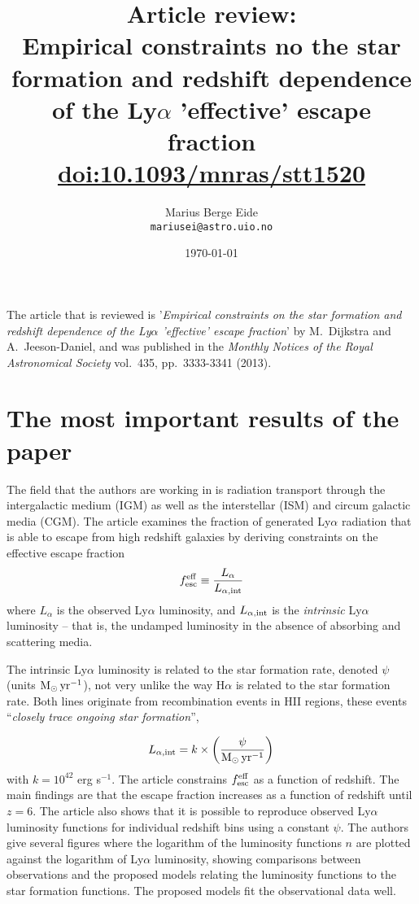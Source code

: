\documentclass[a4paper,11pt]{article}
\date{\today}
\title{\normalsize{Article review:\\ \textbf{Empirical constraints no the star formation and redshift dependence of the Ly$\alpha$ 'effective' escape fraction} \\
\href{http://dx.doi.org/10.1093/mnras/stt1520}{doi:10.1093/mnras/stt1520}} }
\author{Marius Berge Eide \\ \texttt{mariusei@astro.uio.no}}
\begin{document}
\onecolumn
\maketitle{}

The article that is reviewed is '\textit{Empirical constraints on the star formation and redshift dependence of the Ly$\alpha$ 'effective' escape fraction}' by M.~Dijkstra and A.~Jeeson-Daniel, and was published in the \textit{Monthly Notices of the Royal Astronomical Society} vol.~435, pp.~3333-3341 (2013).

\section{The most important results of the paper}
The field that the authors are working in is radiation transport through the intergalactic medium (IGM) as well as the interstellar (ISM) and circum galactic media (CGM). The article examines the fraction of generated Ly$\alpha$ radiation that is able to escape from high redshift galaxies by deriving constraints on the effective escape fraction
\begin{equation}
    f_{\rm esc}^{\rm eff} \equiv \frac{L_\alpha}{L_{\alpha,\rm int}}
    \label{eq:escfrac}
\end{equation}
where $L_\alpha$ is the observed Ly$\alpha$ luminosity, and $L_{\alpha, \rm int}$ is the \textit{intrinsic} Ly$\alpha$ luminosity -- that is, the undamped luminosity in the absence of absorbing and scattering media.

The intrinsic Ly$\alpha$ luminosity is related to the star formation rate, denoted $\psi$ (units $\rm M_{\odot} \, yr^{-1}$), not very unlike the way H$\alpha$ is related to the star formation rate. Both lines originate from recombination events in HII regions, these events ``\textit{closely trace ongoing star formation}'',

\[ L_{\alpha,\rm int} = k \times \left( \frac{\psi}{\rm M_\odot \, yr^{-1}} \right) \]
with $k = 10^{42}$ erg s$^{-1}$. The article constrains $f_{\rm esc}^{\rm eff}$ as a function of redshift. The main findings are that the escape fraction increases as a function of redshift until $z=6$. The article also shows that it is possible to reproduce observed Ly$\alpha$ luminosity functions for individual redshift bins using a constant $\psi$. The authors give several figures where the logarithm of the luminosity functions $n$ are plotted against  the logarithm of Ly$\alpha$ luminosity, showing comparisons between observations and the proposed models relating the luminosity functions to the star formation functions. The proposed models fit the observational data well.
\end{document}
